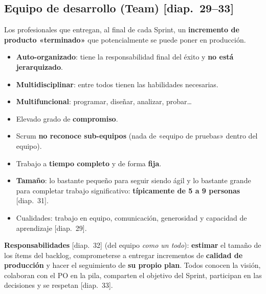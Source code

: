 \documentclass[11pt,a4paper,oneside,openany]{report}
\newcommand{\diap}[1]{\textcolor{mdaPrimary}{\small[diap.~#1]}}
\begin{document}
\subsection{Equipo de desarrollo (Team) \diap{29--33}}
\begin{definicion}
Los profesionales que entregan, al final de cada Sprint, un \textbf{incremento de producto «terminado»} que
potencialmente se puede poner en producción.
\end{definicion}
\begin{itemize}[leftmargin=*]
  \item \textbf{Auto-organizado}: tiene la responsabilidad final del éxito y \textbf{no está jerarquizado}.
  \item \textbf{Multidisciplinar}: entre todos tienen las habilidades necesarias.
  \item \textbf{Multifuncional}: programar, diseñar, analizar, probar…
  \item Elevado grado de \textbf{compromiso}.
  \item Scrum \textbf{no reconoce sub-equipos} (nada de «equipo de pruebas» dentro del equipo).
  \item Trabajo a \textbf{tiempo completo} y de forma \textbf{fija}.
  \item \textbf{Tamaño}: lo bastante pequeño para seguir siendo ágil y lo bastante grande para completar trabajo
        significativo: \textbf{típicamente de 5 a 9 personas} \diap{31}.
  \item Cualidades: trabajo en equipo, comunicación, generosidad y capacidad de aprendizaje \diap{29}.
\end{itemize}
\textbf{Responsabilidades} \diap{32} (del equipo \emph{como un todo}): \textbf{estimar} el tamaño de los ítems del
backlog, comprometerse a entregar incrementos de \textbf{calidad de producción} y hacer el seguimiento de \textbf{su
propio plan}. Todos conocen la visión, colaboran con el PO en la pila, comparten el objetivo del Sprint, participan en
las decisiones y se respetan \diap{33}.
\end{document}
